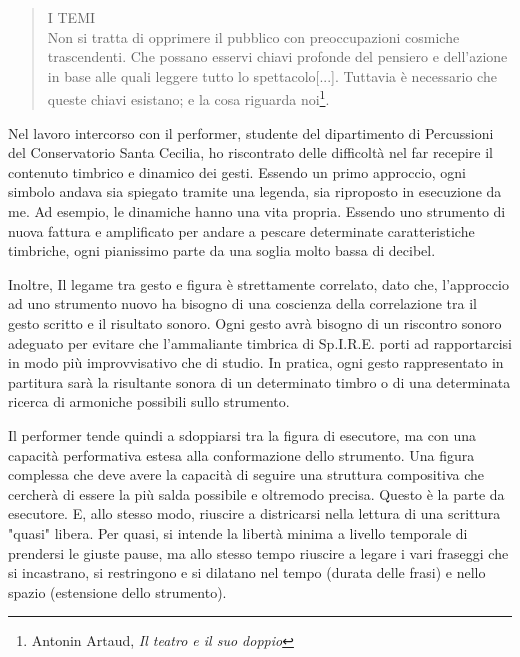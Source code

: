 \begin{quotation}
I TEMI \\ Non si tratta di opprimere il pubblico con preoccupazioni cosmiche trascendenti. Che possano esservi chiavi profonde del pensiero e dell'azione in base alle quali leggere tutto lo spettacolo[...]. Tuttavia è necessario che queste chiavi esistano; e la cosa riguarda noi\footnote{Antonin Artaud, \textit{Il teatro e il suo doppio}}.
\end{quotation}

Nel lavoro intercorso con il performer, studente del dipartimento di Percussioni del Conservatorio Santa Cecilia, ho riscontrato delle difficoltà nel far recepire il contenuto timbrico e dinamico dei gesti. Essendo un primo approccio, ogni simbolo andava sia spiegato tramite una legenda, sia riproposto in esecuzione da me. Ad esempio, le dinamiche hanno una vita propria. Essendo uno strumento di nuova fattura e amplificato per andare a pescare determinate caratteristiche timbriche, ogni pianissimo parte da una soglia molto bassa di decibel.

Inoltre, Il legame tra gesto e figura è strettamente correlato, dato che, l'approccio ad uno strumento nuovo ha bisogno di una coscienza della correlazione tra il gesto scritto e il risultato sonoro. Ogni gesto avrà bisogno di un riscontro sonoro adeguato per evitare che l'ammaliante timbrica di Sp.I.R.E. porti ad rapportarcisi in modo più improvvisativo che di studio. In pratica, ogni gesto rappresentato in partitura sarà la risultante sonora di un determinato timbro o di una determinata ricerca di armoniche possibili sullo strumento.

Il performer tende quindi a sdoppiarsi tra la figura di esecutore, ma con una capacità performativa estesa alla conformazione dello strumento. Una figura complessa che deve avere la capacità di seguire una struttura compositiva che cercherà di essere la più salda possibile e oltremodo precisa. Questo è la parte da esecutore. E, allo stesso modo, riuscire a districarsi nella lettura di una scrittura "quasi" libera. Per quasi, si intende la libertà minima a livello temporale di prendersi le giuste pause, ma allo stesso tempo riuscire a legare i vari fraseggi che si incastrano, si restringono e si dilatano nel tempo (durata delle frasi) e nello spazio (estensione dello strumento).
